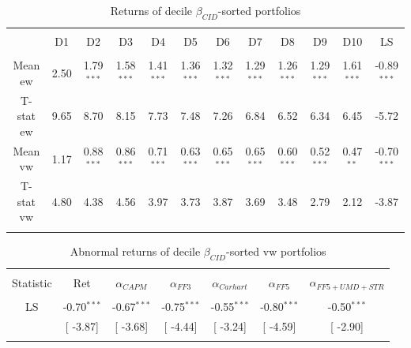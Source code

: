 \documentclass[16pt]{article}
\begin{document}
\begin{table}[!htbp] \centering 
  \caption{Returns of decile $\beta_{CID}$-sorted portfolios} 
  \label{} 
\begin{tabular}{@{\extracolsep{-5pt}} cccccccccccc} 
\\[-1.8ex]\hline 
\hline \\[-1.8ex] 
 & D1 & D2 & D3 & D4 & D5 & D6 & D7 & D8 & D9 & D10 & LS \\ 
\hline \\[-1.8ex] 
Mean ew & 2.50 & 1.79$^{***}$ & 1.58$^{***}$ & 1.41$^{***}$ & 1.36$^{***}$ & 1.32$^{***}$ & 1.29$^{***}$ & 1.26$^{***}$ & 1.29$^{***}$ & 1.61$^{***}$ & -0.89$^{***}$ \\ 
T-stat ew & 9.65 & 8.70 & 8.15 & 7.73 & 7.48 & 7.26 & 6.84 & 6.52 & 6.34 & 6.45 & -5.72 \\ 
Mean vw & 1.17 & 0.88$^{***}$ & 0.86$^{***}$ & 0.71$^{***}$ & 0.63$^{***}$ & 0.65$^{***}$ & 0.65$^{***}$ & 0.60$^{***}$ & 0.52$^{***}$ & 0.47$^{**}$ & -0.70$^{***}$ \\ 
T-stat vw & 4.80 & 4.38 & 4.56 & 3.97 & 3.73 & 3.87 & 3.69 & 3.48 & 2.79 & 2.12 & -3.87 \\ 
\hline \\[-1.8ex] 
\end{tabular} 
\end{table}



\begin{table}[!htbp] \centering 
  \caption{Abnormal returns of decile $\beta_{CID}$-sorted vw portfolios} 
  \label{} 
\begin{tabular}{@{\extracolsep{0pt}} ccccccc} 
\\[-1.8ex]\hline 
\hline \\[-1.8ex] 
Statistic & Ret & $\alpha_{CAPM}$ & $\alpha_{FF3}$ & $\alpha_{Carhart}$ & $\alpha_{FF5}$ & $\alpha_{FF5+UMD+STR}$ \\ 
\hline \\[-1.8ex] 
LS & -0.70$^{***}$ & -0.67$^{***}$ & -0.75$^{***}$ & -0.55$^{***}$ & -0.80$^{***}$ & -0.50$^{***}$ \\ 
 & [ -3.87] & [ -3.68] & [ -4.44] & [ -3.24] & [ -4.59] & [ -2.90] \\ 
\hline \\[-1.8ex] 
\end{tabular} 
\end{table}
\end{document}
